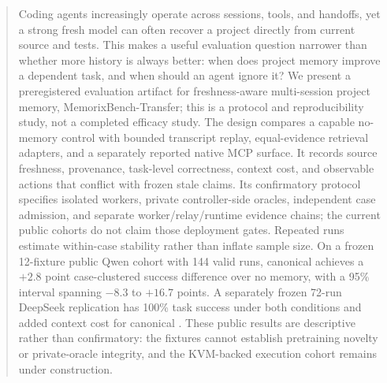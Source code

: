 \begin{abstract}
Coding agents increasingly operate across sessions, tools, and handoffs, yet a
strong fresh model can often recover a project directly from current source and
tests. This makes a useful evaluation question narrower than whether more
history is always better: when does project memory improve a dependent task, and
when should an agent ignore it? We present a preregistered evaluation artifact
for freshness-aware multi-session project memory, MemorixBench-Transfer; this
is a protocol and reproducibility study, not a completed efficacy study. The
design compares a
capable no-memory control with bounded transcript replay, equal-evidence
retrieval adapters, and a separately reported native \memorix{} MCP surface.
It records source freshness, provenance, task-level correctness, context cost,
and observable actions that conflict with frozen stale claims. Its confirmatory
protocol specifies isolated workers, private controller-side oracles,
independent case admission, and separate worker/relay/runtime evidence chains;
the current public cohorts do not claim those deployment gates. Repeated runs
estimate within-case stability rather than inflate sample size. On a frozen 12-fixture public Qwen
cohort with 144 valid runs, canonical \memorix{} achieves a $+2.8$ point
case-clustered success difference over no memory, with a 95\% interval spanning
$-8.3$ to $+16.7$ points. A separately frozen 72-run DeepSeek replication has
100\% task success under both conditions and added context cost for canonical
\memorix{}. These public results are descriptive rather than confirmatory:
the fixtures cannot establish pretraining novelty or private-oracle integrity,
and the KVM-backed execution cohort remains under construction.
\end{abstract}
